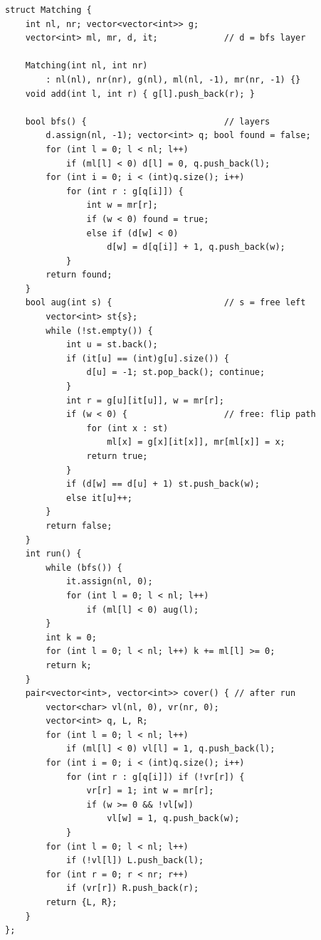 \begin{lstlisting}
struct Matching {
    int nl, nr; vector<vector<int>> g;
    vector<int> ml, mr, d, it;             // d = bfs layer

    Matching(int nl, int nr)
        : nl(nl), nr(nr), g(nl), ml(nl, -1), mr(nr, -1) {}
    void add(int l, int r) { g[l].push_back(r); }

    bool bfs() {                           // layers
        d.assign(nl, -1); vector<int> q; bool found = false;
        for (int l = 0; l < nl; l++)
            if (ml[l] < 0) d[l] = 0, q.push_back(l);
        for (int i = 0; i < (int)q.size(); i++)
            for (int r : g[q[i]]) {
                int w = mr[r];
                if (w < 0) found = true;
                else if (d[w] < 0)
                    d[w] = d[q[i]] + 1, q.push_back(w);
            }
        return found;
    }
    bool aug(int s) {                      // s = free left
        vector<int> st{s};
        while (!st.empty()) {
            int u = st.back();
            if (it[u] == (int)g[u].size()) {
                d[u] = -1; st.pop_back(); continue;
            }
            int r = g[u][it[u]], w = mr[r];
            if (w < 0) {                   // free: flip path
                for (int x : st)
                    ml[x] = g[x][it[x]], mr[ml[x]] = x;
                return true;
            }
            if (d[w] == d[u] + 1) st.push_back(w);
            else it[u]++;
        }
        return false;
    }
    int run() {
        while (bfs()) {
            it.assign(nl, 0);
            for (int l = 0; l < nl; l++)
                if (ml[l] < 0) aug(l);
        }
        int k = 0;
        for (int l = 0; l < nl; l++) k += ml[l] >= 0;
        return k;
    }
    pair<vector<int>, vector<int>> cover() { // after run
        vector<char> vl(nl, 0), vr(nr, 0);
        vector<int> q, L, R;
        for (int l = 0; l < nl; l++)
            if (ml[l] < 0) vl[l] = 1, q.push_back(l);
        for (int i = 0; i < (int)q.size(); i++)
            for (int r : g[q[i]]) if (!vr[r]) {
                vr[r] = 1; int w = mr[r];
                if (w >= 0 && !vl[w])
                    vl[w] = 1, q.push_back(w);
            }
        for (int l = 0; l < nl; l++)
            if (!vl[l]) L.push_back(l);
        for (int r = 0; r < nr; r++)
            if (vr[r]) R.push_back(r);
        return {L, R};
    }
};
\end{lstlisting}

